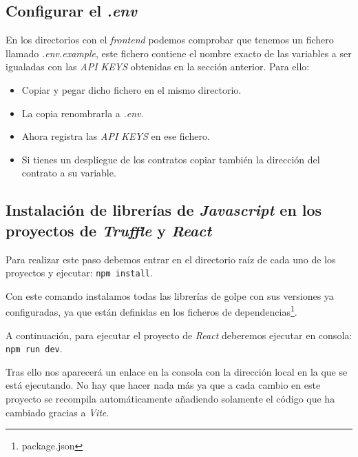 \subsection{Configurar el \textit{.env}}
En los directorios con el \textit{frontend} podemos comprobar que tenemos un fichero llamado \textit{.env.example}, este fichero contiene el nombre exacto de las variables a ser igualadas con las \textit{API KEYS} obtenidas en la sección anterior. Para ello:
\begin{itemize}
    \item Copiar y pegar dicho fichero en el mismo directorio.
    \item La copia renombrarla a \textit{.env}.
    \item Ahora registra las \textit{API KEYS} en ese fichero.
    \item Si tienes un despliegue de los contratos copiar también la dirección del contrato a su variable.
\end{itemize}

\subsection{Instalación de librerías de \textit{Javascript} en los proyectos de \textit{Truffle} y \textit{React}}
Para realizar este paso debemos entrar en el directorio raíz de cada uno de los proyectos y ejecutar: \texttt{npm install}.

Con este comando instalamos todas las librerías de golpe con sus versiones ya configuradas, ya que están definidas en los ficheros de dependencias\footnote{package.json}.

A continuación, para ejecutar el proyecto de \textit{React} deberemos ejecutar en consola: \texttt{npm run dev}.

Tras ello nos aparecerá un enlace en la consola con la dirección local en la que se está ejecutando. No hay que hacer nada más ya que a cada cambio en este proyecto se recompila automáticamente añadiendo solamente el código que ha cambiado gracias a \textit{Vite}.

